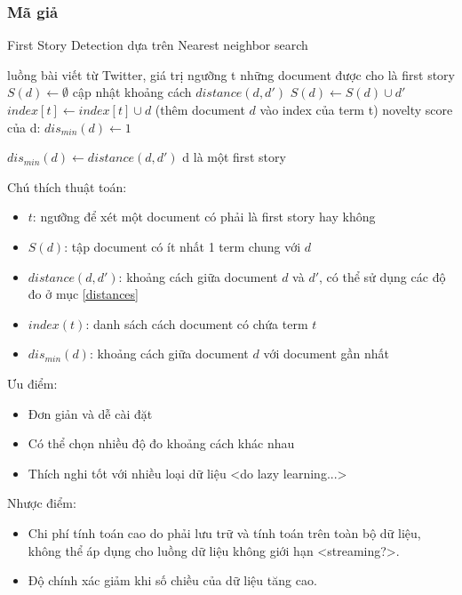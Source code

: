 	\subsubsection{Mã giả}
	\begin{algorithm}[H]
		\caption{First Story Detection dựa trên Nearest neighbor search}
		\begin{algorithmic}[1]
			\REQUIRE luồng bài viết từ Twitter, giá trị ngưỡng t
			\ENSURE những document được cho là first story
			\State $S(d) \leftarrow \emptyset$
			\State cập nhật khoảng cách $distance(d,d')$
			\State $S(d) \leftarrow S(d) \cup d'$
			\ENDFOR 
			\State $index[t] \leftarrow index[t] \cup d$ (thêm document $d$ vào index của term t)
			\ENDFOR
			\STATE novelty score của d: $dis_{min}(d) \leftarrow 1$
			
			\STATE $dis_{min}(d) \leftarrow distance(d,d')$
			\ENDIF
			\ENDFOR
			\STATE d là một first story
			\ENDIF
			\ENDFOR	
			
		\end{algorithmic}
	\end{algorithm}
	Chú thích thuật toán:
	\begin{itemize}
		\item $t$: ngưỡng để xét một document có phải là first story hay không
		\item $S(d)$: tập document có ít nhất 1 term chung với $d$
		\item $distance(d,d')$: khoảng cách giữa document $d$ và $d'$, có thể sử dụng các độ đo ở mục \ref{distances}
		\item $index(t)$: danh sách cách document có chứa term $t$
		\item $dis_{min}(d)$: khoảng cách giữa document $d$ với document gần nhất
	\end{itemize}
	
	Ưu điểm:
	\begin{itemize}
		\item Đơn giản và dễ cài đặt
		\item Có thể chọn nhiều độ đo khoảng cách khác nhau
		\item Thích nghi tốt với nhiều loại dữ liệu <do lazy learning...>
	\end{itemize}
	Nhược điểm:
	\begin{itemize}
		\item Chi phí tính toán cao do phải lưu trữ và tính toán trên toàn bộ dữ liệu, không thể áp dụng cho luồng dữ liệu không giới hạn <streaming?>.
		\item Độ chính xác giảm khi số chiều của dữ liệu tăng cao.
	\end{itemize}
	
